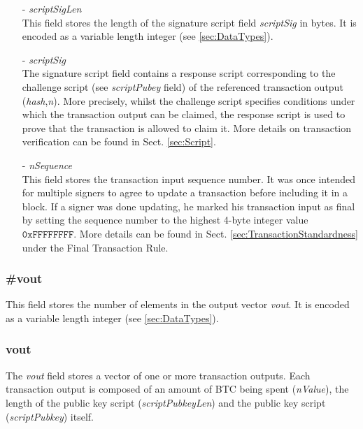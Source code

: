 \begin{itemize}
\item[-] \textit{scriptSigLen}~\\
This field stores the length of the signature script field \textit{scriptSig} in bytes. It is encoded as a variable length integer (see \ref{sec:DataTypes}).

\item[-] \textit{scriptSig}~\\
The signature script field contains a response script corresponding to the challenge script (see \textit{scriptPubey} field) of the referenced transaction output (\textit{hash},\textit{n}). More precisely, whilst the challenge script specifies conditions under which the transaction output can be claimed, the response script is used to prove that the transaction is allowed to claim it. More details on transaction verification can be found in Sect. \ref{sec:Script}.~\\

\item[-] \textit{nSequence}~\\
This field stores the transaction input sequence number. It was once intended for multiple signers to agree to update a transaction before including it in a block. If a signer was done updating, he marked his transaction input as final by setting the sequence number to the highest 4-byte integer value $\texttt{0xFFFFFFFF}$. More details can be found in Sect. \ref{sec:TransactionStandardness} under the Final Transaction Rule.
\end{itemize}

\subsubsection*{\#vout}
This field stores the number of elements in the output vector \textit{vout}. It is encoded as a variable length integer (see \ref{sec:DataTypes}).

\subsubsection*{vout}
The \textit{vout} field stores a vector of one or more transaction outputs. Each transaction output is composed of an amount of BTC being spent (\textit{nValue}), the length of the public key script (\textit{scriptPubkeyLen}) and the public key script (\textit{scriptPubkey}) itself.

